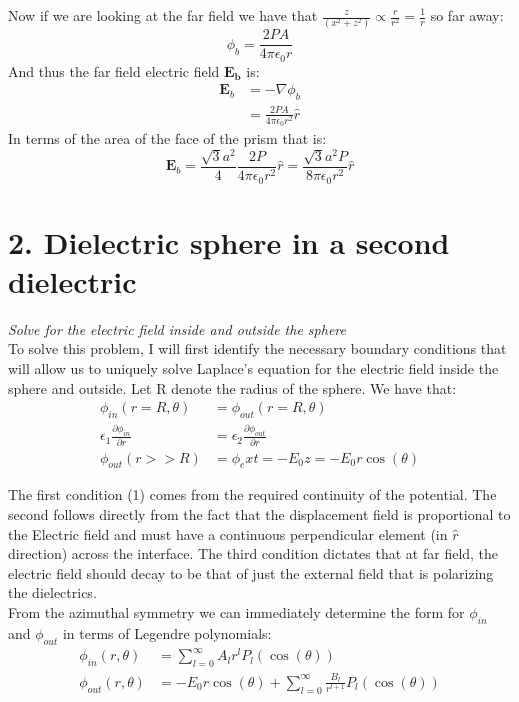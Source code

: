 \documentclass[a4paper, 11pt]{article}
\begin{document}
Now if we are looking at the far field we have that $\frac{z}{(x^2+z^2)} \propto \frac{r}{r^2}=\frac{1}{r}$ so far away: 
	\begin{equation*}
		\phi_b = \frac{2PA}{4\pi\epsilon_0 r}
	\end{equation*}	
And thus the far field electric field $\mathbf{E_b}$ is: 
	\begin{align*}
		\mathbf{E}_b &= -\nabla\phi_b \\ 
		&= \frac{2PA}{4\pi\epsilon_0 r^2}\hat{r}
	\end{align*}	
In terms of the area of the face of the prism that is: 
	\begin{equation*}
		\mathbf{E}_b = \frac{\sqrt{3}a^2}{4}\frac{2P}{4\pi\epsilon_0 r^2}\hat{r} = \frac{\sqrt{3}a^2P}{8\pi\epsilon_0 r^2}\hat{r}
	\end{equation*}
	
\section*{2. Dielectric sphere in a second dielectric}
\textit{Solve for the electric field inside and outside the sphere}\\

\noindent To solve this problem, I will first identify the necessary boundary conditions that will allow us to uniquely solve Laplace's equation for the electric field inside the sphere and outside. Let R denote the radius of the sphere. We have that: 
	\begin{align}
		\phi_{in}(r=R, \theta) &= \phi_{out}(r=R, \theta) \\ 
		\epsilon_1 \frac{\partial \phi_{in}}{\partial r} &= \epsilon_2 \frac{\partial \phi_{out}}{\partial r} \\ 
		\phi_{out}(r>>R) &= \phi_ext = -E_0z = -E_0r\cos(\theta)
	\end{align}

\noindent The first condition (1) comes from the required continuity of the potential. The second follows directly from the fact that the displacement field is proportional to the Electric field and must have a continuous perpendicular element (in $\hat{r}$ direction) across the interface. The third condition dictates that at far field, the electric field should decay to be that of just the external field that is polarizing the dielectrics. \\

\noindent From the azimuthal symmetry we can immediately determine the form for $\phi_{in}$ and $\phi_{out}$ in terms of Legendre polynomials: 
	\begin{align*}
		\phi_{in}(r,\theta) &= \sum\limits_{l=0}^{\infty}A_l r^l P_l(\cos(\theta)) \\
		\phi_{out}(r, \theta) &= -E_0r\cos(\theta) + \sum\limits_{l=0}^{\infty}\frac{B_l}{r^{l+1}}P_l(\cos(\theta))
	\end{align*}
	
\end{document}

